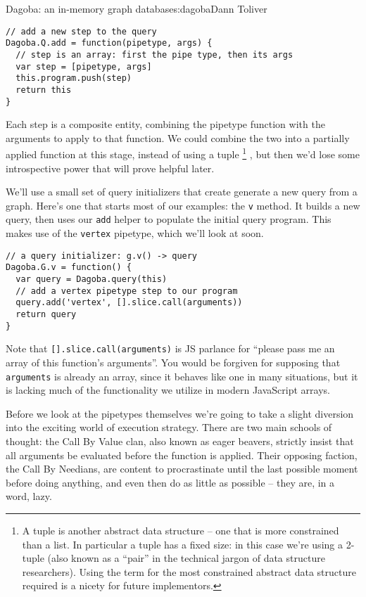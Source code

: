 \begin{aosachapter}{Dagoba: an in-memory graph database}{s:dagoba}{Dann Toliver}
\begin{verbatim}
// add a new step to the query
Dagoba.Q.add = function(pipetype, args) {    
  // step is an array: first the pipe type, then its args
  var step = [pipetype, args]
  this.program.push(step)                    
  return this
}
\end{verbatim}

Each step is a composite entity, combining the pipetype function with
the arguments to apply to that function. We could combine the two into a
partially applied function at this stage, instead of using a tuple
\footnote{A tuple is another abstract data structure -- one that is more
  constrained than a list. In particular a tuple has a fixed size: in
  this case we're using a 2-tuple (also known as a ``pair'' in the
  technical jargon of data structure researchers). Using the term for
  the most constrained abstract data structure required is a nicety for
  future implementors.} , but then we'd lose some introspective power
that will prove helpful later.

We'll use a small set of query initializers that create generate a new
query from a graph. Here's one that starts most of our examples: the
\texttt{v} method. It builds a new query, then uses our \texttt{add}
helper to populate the initial query program. This makes use of the
\texttt{vertex} pipetype, which we'll look at soon.

\begin{verbatim}
// a query initializer: g.v() -> query
Dagoba.G.v = function() {                                         
  var query = Dagoba.query(this)
  // add a vertex pipetype step to our program
  query.add('vertex', [].slice.call(arguments))                   
  return query
}
\end{verbatim}

Note that \texttt{{[}{]}.slice.call(arguments)} is JS parlance for
``please pass me an array of this function's arguments''. You would be
forgiven for supposing that \texttt{arguments} is already an array,
since it behaves like one in many situations, but it is lacking much of
the functionality we utilize in modern JavaScript arrays.

\label{the-problem-with-being-eager}

Before we look at the pipetypes themselves we're going to take a slight
diversion into the exciting world of execution strategy. There are two
main schools of thought: the Call By Value clan, also known as eager
beavers, strictly insist that all arguments be evaluated before the
function is applied. Their opposing faction, the Call By Needians, are
content to procrastinate until the last possible moment before doing
anything, and even then do as little as possible -- they are, in a word,
lazy.


\end{aosachapter}
